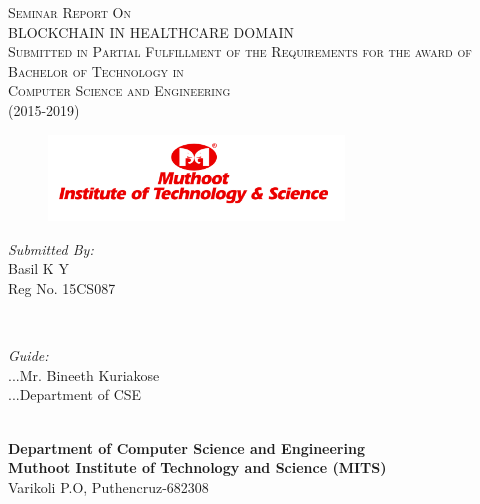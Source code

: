\documentclass[12pt]{report}
\begin{document}
\begin{titlepage}
\center

\textsc{\large Seminar Report On}\\[1.0cm] %
\textsc{\Large BLOCKCHAIN IN HEALTHCARE DOMAIN}\\[1.0cm] %
\textsc{\large Submitted in Partial Fulfillment of the Requirements for the award of \\ Bachelor of Technology in \\ Computer Science and Engineering\\ (2015-2019)}\\[0.5cm] 

\begin{figure}[H]
\centering
\includegraphics[width=0.7\textwidth]{logo.png}\\
\end{figure}

\vspace{2.0cm}

\begin{minipage}{0.4\textwidth}
\begin{flushleft} \large
\emph{Submitted By:}\\
\hspace{0.3cm}Basil K Y\\
\hspace{0.3cm}Reg No. 15CS087\\
\end{flushleft}
\end{minipage}
~~~~~~~~~~~~~~~~~~~~
\begin{minipage}{0.4\textwidth}
\large
\emph{Guide:} \\
\color{white}...\color{black}Mr. Bineeth Kuriakose\\
\color{white}...\color{black}Department of CSE 
\end{minipage}\\[2cm]

\textbf{Department of Computer Science and Engineering}\\
\textbf{Muthoot Institute of Technology and Science (MITS)} \\
Varikoli P.O, Puthencruz-682308
\end{titlepage}
\end{document}

